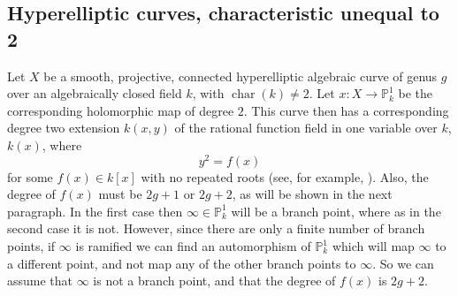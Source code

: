 \documentclass[draft, 11pt]{article} %
\theoremstyle{plain}
\theoremstyle{remark}
\DeclareMathOperator{\cha}{char}
\begin{document}
  
  \subsection{Hyperelliptic curves, characteristic unequal to 2}\label{charneq2}
  Let $X$ be a smooth, projective, connected hyperelliptic algebraic curve of genus $g$ over an algebraically closed field $k$, with $\cha (k) \neq 2$.
Let $x:X\rightarrow \mathbb{P}_k^1$ be the corresponding holomorphic map of degree $2$.
This curve then has a corresponding degree two extension $k(x,y)$ of the rational function field in one variable over $k$, $k(x)$, where
\begin{equation}\label{definingequation}
 y^2 = f(x)
\end{equation}
for some $f(x)\in k[x]$ with no repeated roots (see, for example, \cite[7.4.3]{liu}).
Also, the degree of $f(x)$ must be $2g+1$ or $2g+2$, as will be shown in the next paragraph.
In the first case then $\infty \in \mathbb P_k^1$ will be a branch point, where as in the second case it is not.
However, since there are only a finite number of branch points, if $\infty$ is ramified we can find an automorphism of $\mathbb P_k^1$ which will map $\infty$ to a different point, and not map any of the other branch points to $\infty$.
So we can assume that $\infty$ is not a branch point, and that the degree of $f(x)$ is $2g+2$.
\end{document}
